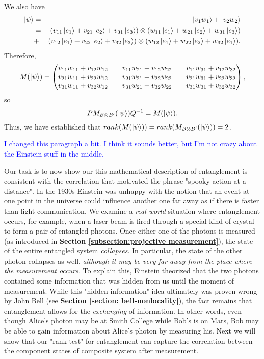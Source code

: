 \begin{example}

We also have
\begin{eqnarray*}
\ket{\psi}&=&\ket{v_1 w_1}+\ket{v_2 w_2}\\
&=& (v_{11}\ket{e_1}+v_{21}\ket{e_2}+v_{31}\ket{e_3}) \otimes (w_{11}\ket{e_1}+w_{21}\ket{e_2}+w_{31}\ket{e_3}) \\
&+& (v_{12}\ket{e_1}+v_{22}\ket{e_2}+v_{32}\ket{e_3}) \otimes (w_{12}\ket{e_1}+w_{22}\ket{e_2}+w_{32}\ket{e_1}).
\end{eqnarray*}
Therefore,
\begin{equation}
M(\ket{\psi})=
\begin{pmatrix}
v_{11}w_{11}+v_{12}w_{12} && v_{11}w_{21}+v_{12}w_{22} && v_{11}w_{31}+v_{12}w_{32}\\
v_{21}w_{11}+v_{22}w_{12} && v_{21}w_{21}+v_{22}w_{22} && v_{21}w_{31}+v_{22}w_{32} \\
v_{31}w_{11}+v_{32}w_{12} && v_{31}w_{21}+v_{32}w_{22} && v_{31}w_{31}+v_{32}w_{32} 
\end{pmatrix},
\end{equation}
so 
$$PM_{B \otimes B'}(\ket{\psi})Q^{-1}=M(\ket{\psi}).$$
Thus, we have established that $rank(M(\ket{\psi}))=rank(M_{B \otimes B'}(\ket{\psi}))=2$.
\end{example}


\textcolor{blue}{I changed this paragraph a bit.  I think it sounds better, but I'm not crazy about the Einstein stuff in the middle.}

Our task is to now show our this mathematical description of entanglement is consistent with the correlation that motivated the phrase "spooky action at a distance". In the 1930s Einstein was unhappy with the notion that an event at one point in the universe could influence another one far away as if there is faster than light communication.  We examine a {\emph{real world}} situation where entanglement occurs, for example, when a laser beam is fired through a special kind of crystal to form a pair of entangled photons. Once either one of the photons is measured (as introduced in \textbf{Section \ref{subsection:projective measurement}}), the state of the entire entangled system {\emph{collapses}}.  In particular, the state of the other photon collapses as well, {\emph{although it may be very far away from the place where the measurement occurs.}} To explain this, Einstein theorized that the two photons contained some information that was hidden from us until the moment of measurement. While this "hidden information" idea ultimately was proven wrong by John Bell (see \textbf{Section \ref{section: bell-nonlocality}}), the fact remains that entanglement allows for the {\emph{exchanging}} of information. In other words, even though Alice's photon may be at Smith College while Bob's is on Mars, Bob may be able to gain information about Alice's photon by measuring his. Next we will show that our "rank test" for entanglement can capture the correlation between the component states of composite system after measurement.

